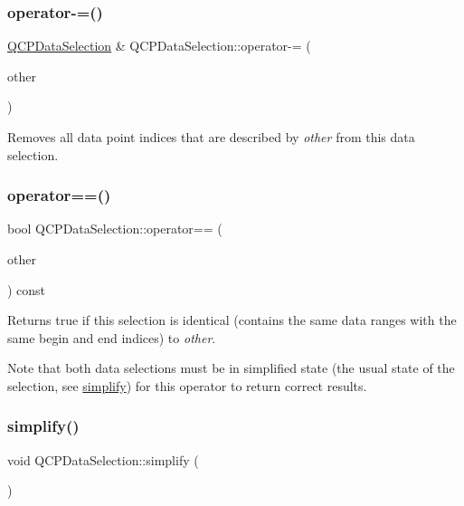 \subsubsection{\texorpdfstring{operator-\/=()}{operator-=()}\hspace{0.1cm}{\footnotesize\ttfamily [2/2]}}
{\footnotesize\ttfamily \mbox{\hyperlink{class_q_c_p_data_selection}{Q\+C\+P\+Data\+Selection}} \& Q\+C\+P\+Data\+Selection\+::operator-\/= (\begin{DoxyParamCaption}\item[{const \mbox{\hyperlink{class_q_c_p_data_range}{Q\+C\+P\+Data\+Range}} \&}]{other }\end{DoxyParamCaption})}

Removes all data point indices that are described by {\itshape other} from this data selection. \mbox{\label{class_q_c_p_data_selection_a664fa566569b17148abafd6b1dbbf347}} 
\subsubsection{\texorpdfstring{operator==()}{operator==()}}
{\footnotesize\ttfamily bool Q\+C\+P\+Data\+Selection\+::operator== (\begin{DoxyParamCaption}\item[{const \mbox{\hyperlink{class_q_c_p_data_selection}{Q\+C\+P\+Data\+Selection}} \&}]{other }\end{DoxyParamCaption}) const}

Returns true if this selection is identical (contains the same data ranges with the same begin and end indices) to {\itshape other}.

Note that both data selections must be in simplified state (the usual state of the selection, see \mbox{\hyperlink{class_q_c_p_data_selection_a4a2fbad1a6e4d1dd26fdfdf88956f2a4}{simplify}}) for this operator to return correct results. \mbox{\label{class_q_c_p_data_selection_a4a2fbad1a6e4d1dd26fdfdf88956f2a4}} 
\subsubsection{\texorpdfstring{simplify()}{simplify()}}
{\footnotesize\ttfamily void Q\+C\+P\+Data\+Selection\+::simplify (\begin{DoxyParamCaption}{ }\end{DoxyParamCaption})}

